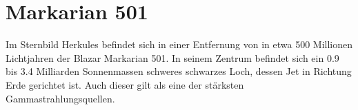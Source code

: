 \section{Markarian 501}
Im Sternbild Herkules befindet sich in einer Entfernung von in etwa 500 Millionen Lichtjahren der Blazar Markarian 501. 
In seinem Zentrum befindet sich ein \num{0.9} bis \num{3.4} Milliarden Sonnenmassen schweres schwarzes Loch, dessen Jet in Richtung Erde gerichtet ist.
Auch dieser gilt als eine der stärksten Gammastrahlungsquellen.
